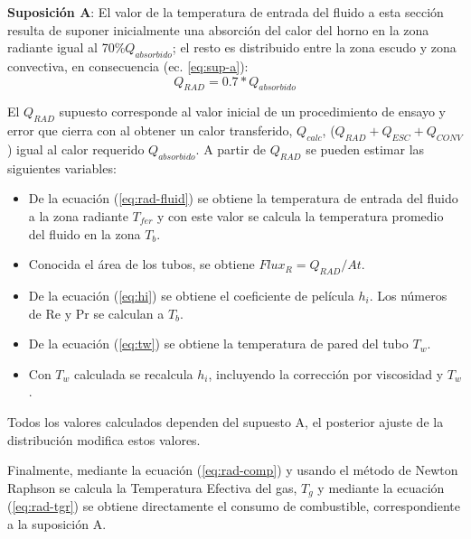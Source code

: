 \par \textbf{Suposición A}: El valor de la temperatura de entrada del fluido a esta sección resulta de suponer inicialmente una absorción del calor del horno en la zona radiante igual al 70\%$Q_{absorbido}$; el resto es distribuido entre la zona escudo y zona convectiva, en consecuencia (ec. \ref{eq:sup-a}):
\begin{equation}\label{eq:sup-a} Q_{RAD} = 0.7 * Q_{absorbido} \end{equation}
\par El $Q_{RAD}$ supuesto corresponde al valor inicial de un procedimiento de ensayo y error que cierra con al obtener un calor transferido, $Q_{calc}$, ($Q_{RAD} + Q_{ESC} + Q_{CONV}$) igual al calor requerido $Q_{absorbido}$. A partir de $Q_{RAD}$ se pueden estimar las siguientes variables:
\begin{itemize}
    \item De la ecuación (\ref{eq:rad-fluid}) se obtiene la temperatura de entrada del fluido a la zona radiante $T_{fer}$ y con este valor se calcula la temperatura promedio del fluido en la zona $T_b$.
    \item Conocida el área de los tubos, se obtiene $Flux_R = Q_{RAD} /At$.
    \item De la ecuación (\ref{eq:hi}) se obtiene el coeficiente de película $h_i$. Los números de Re y Pr se calculan a $T_b$.
    \item De la ecuación (\ref{eq:tw}) se obtiene la temperatura de pared del tubo $T_w$.
    \item Con $T_w$ calculada se recalcula $h_i$, incluyendo la corrección por viscosidad y $T_w$.
\end{itemize}
\par Todos los valores calculados dependen del supuesto A, el posterior ajuste de la distribución modifica estos valores.
\par Finalmente, mediante la ecuación (\ref{eq:rad-comp}) y usando el método de Newton Raphson se calcula la Temperatura Efectiva del gas, $T_g$ y mediante la ecuación (\ref{eq:rad-tgr}) se obtiene directamente el consumo de combustible, correspondiente a la suposición A.

